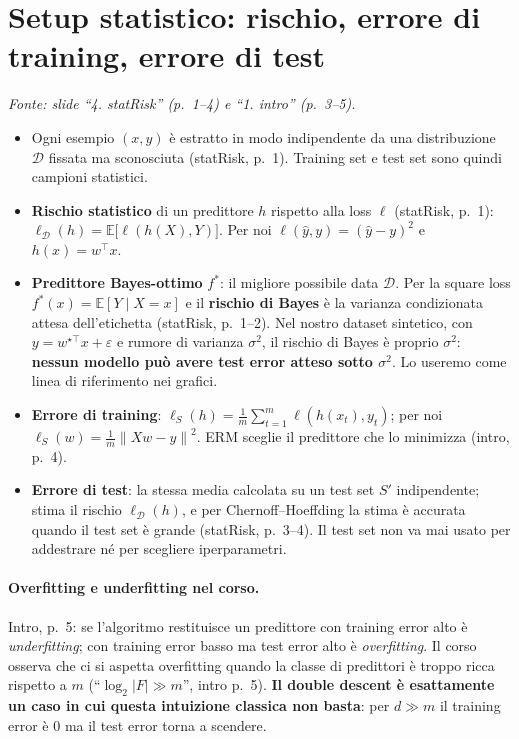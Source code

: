 \documentclass[11pt,a4paper]{article}
\newcommand{\E}{\mathbb{E}}
\newcommand{\norm}[1]{\left\lVert #1 \right\rVert}
\newcommand{\fonte}[1]{\par\noindent\textit{Fonte: #1}\par\smallskip}
\begin{document}
\section{Setup statistico: rischio, errore di training, errore di test}
\fonte{slide ``4. statRisk'' (p.~1--4) e ``1. intro'' (p.~3--5).}

\begin{itemize}
  \item Ogni esempio $(x,y)$ è estratto in modo indipendente da una distribuzione $\mathcal{D}$ fissata ma sconosciuta
        (statRisk, p.~1). Training set e test set sono quindi campioni statistici.
  \item \textbf{Rischio statistico} di un predittore $h$ rispetto alla loss $\ell$ (statRisk, p.~1):
        $\ell_{\mathcal{D}}(h) = \E\bigl[\ell(h(X), Y)\bigr]$. Per noi $\ell(\hat y, y) = (\hat y - y)^2$ e $h(x) = w^\top x$.
  \item \textbf{Predittore Bayes-ottimo} $f^\ast$: il migliore possibile data $\mathcal{D}$. Per la square loss
        $f^\ast(x) = \E[Y \mid X = x]$ e il \textbf{rischio di Bayes} è la varianza condizionata attesa dell'etichetta
        (statRisk, p.~1--2). Nel nostro dataset sintetico, con $y = w^{\star\top}x + \varepsilon$ e rumore di varianza
        $\sigma^2$, il rischio di Bayes è proprio $\sigma^2$: \textbf{nessun modello può avere test error atteso sotto $\sigma^2$}.
        Lo useremo come linea di riferimento nei grafici.
  \item \textbf{Errore di training}: $\ell_S(h) = \frac{1}{m}\sum_{t=1}^{m} \ell(h(x_t), y_t)$; per noi
        $\ell_S(w) = \frac{1}{m}\norm{Xw - y}^2$. ERM sceglie il predittore che lo minimizza (intro, p.~4).
  \item \textbf{Errore di test}: la stessa media calcolata su un test set $S'$ indipendente; stima il rischio
        $\ell_{\mathcal{D}}(h)$, e per Chernoff--Hoeffding la stima è accurata quando il test set è grande (statRisk, p.~3--4).
        Il test set non va mai usato per addestrare né per scegliere iperparametri.
\end{itemize}

\paragraph{Overfitting e underfitting nel corso.}
Intro, p.~5: se l'algoritmo restituisce un predittore con training error alto è \emph{underfitting}; con training error
basso ma test error alto è \emph{overfitting}. Il corso osserva che ci si aspetta overfitting quando la classe di
predittori è troppo ricca rispetto a $m$ (``$\log_2|F| \gg m$'', intro p.~5). \textbf{Il double descent è esattamente un caso
in cui questa intuizione classica non basta}: per $d \gg m$ il training error è $0$ ma il test error torna a scendere.
\end{document}
